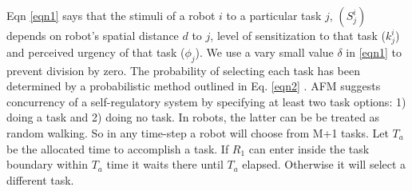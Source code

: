 \documentclass{llncs}
\begin{document}
Eqn \ref{eqn1} says that the stimuli of a robot $i$ to a particular task $j$, $(S_{j}^{i})$ depends on robot's spatial distance $d$ to $j$, level of sensitization to that task ($k_{j}^{i}$) and perceived urgency of that task ($\phi _{j}$). We use a vary small value $\delta$ in \ref{eqn1} to prevent  division by zero. The probability of selecting each task has been determined by a probabilistic method outlined in Eq. \ref{eqn2} . 
AFM suggests concurrency of a self-regulatory system by specifying at least two task options: 1) doing a task and 2) doing no task. In robots, the latter can be   be treated as random walking. So in any time-step a robot will choose from M+1 tasks. Let $T_a$ be the allocated time to accomplish a task. If $R_1$ can enter inside the task boundary within $T_a$ time it waits there until $T_a$ elapsed. Otherwise it will select a different task. 
\end{document}
